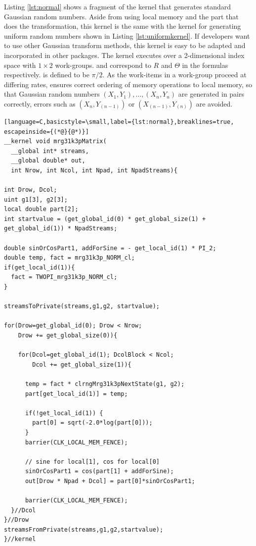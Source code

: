 \documentclass[article,nojss]{jss}\usepackage[]{graphicx}\usepackage[]{color}
\begin{document}
Listing \ref{lst:normal} shows a fragment of the kernel that generates standard Gaussian random numbers. Aside from using local memory and the part that does the transformation, this kernel is the same with the kernel for generating uniform random numbers shown in Listing \ref{lst:uniformkernel}. If developers want to use other Gaussian transform methods, this kernel is easy to be adapted and incorporated in other  packages. The kernel executes over a 2-dimensional index space with $1 \times 2$ work-groups.  and  correspond to $R$ and $\Theta$ in the formulas respectively.  is defined to be $\pi/2$. As the work-items in a work-group proceed at differing rates,  ensures correct ordering of memory operations to local memory, so that Gaussian random numbers $(X_1,Y_1), \dots, (X_n,Y_n)$ are generated in pairs correctly, errors such as $(X_n, Y_{(n-1)})$ or $(X_{(n-1)}, Y_{(n)})$ are avoided.
%
\begin{framed}
\begin{lstlisting}[language=C,basicstyle=\small,label={lst:normal},breaklines=true, escapeinside={(*@}{@*)}]
__kernel void mrg31k3pMatrix(
  __global int* streams,
  __global double* out,
  int Nrow, int Ncol, int Npad, int NpadStreams){

int Drow, Dcol;
uint g1[3], g2[3];
local double part[2];
int startvalue = (get_global_id(0) * get_global_size(1) + 
get_global_id(1)) * NpadStreams;

double sinOrCosPart1, addForSine = - get_local_id(1) * PI_2;
double temp, fact = mrg31k3p_NORM_cl;
if(get_local_id(1)){
  fact = TWOPI_mrg31k3p_NORM_cl;
}

streamsToPrivate(streams,g1,g2, startvalue);

for(Drow=get_global_id(0); Drow < Nrow;
    Drow += get_global_size(0)){

    for(Dcol=get_global_id(1); DcolBlock < Ncol; 
        Dcol += get_global_size(1)){
        
      temp = fact * clrngMrg31k3pNextState(g1, g2);
      part[get_local_id(1)] = temp;
      
      if(!get_local_id(1)) {
        part[0] = sqrt(-2.0*log(part[0]));
      }
      barrier(CLK_LOCAL_MEM_FENCE);
      
      // sine for local[1], cos for local[0]
      sinOrCosPart1 = cos(part[1] + addForSine);
      out[Drow * Npad + Dcol] = part[0]*sinOrCosPart1;

      barrier(CLK_LOCAL_MEM_FENCE);
  }//Dcol
}//Drow
streamsFromPrivate(streams,g1,g2,startvalue);
}//kernel
\end{lstlisting}
\end{framed}
\end{document}
